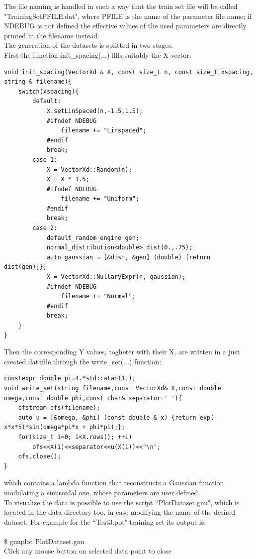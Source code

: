 \documentclass[12pt, a4paper]{report}
\theoremstyle{definition}
\begin{document}
The file naming is handled in such a way that the train set file will be called "TrainingSetPFILE.dat", where PFILE is the name of the parameter file name; if {\ttfamily NDEBUG} is not defined the effective values of the used parameters are directly printed in the filename instead.\\
The generation of the datasets is splitted in two stages.\\
First the function {\ttfamily init\_spacing(...)} fills suitably the X vector:
\begin{lstlisting}[frame=single, showstringspaces=false]
void init_spacing(VectorXd & X, const size_t n, const size_t xspacing, string & filename){
	switch(xspacing){
		default:
			X.setLinSpaced(n,-1.5,1.5);
			#ifndef NDEBUG
				filename += "Linspaced";
			#endif
			break;
		case 1:
			X = VectorXd::Random(n);
			X = X * 1.5;
			#ifndef NDEBUG
				filename += "Uniform";
			#endif
			break;
		case 2:
			default_random_engine gen;
			normal_distribution<double> dist(0.,.75);
			auto gaussian = [&dist, &gen] (double) {return dist(gen);};
			X = VectorXd::NullaryExpr(n, gaussian);
			#ifndef NDEBUG
				filename += "Normal";
			#endif
			break;
	}
}
\end{lstlisting} 
Then the corresponding Y values, togheter with their X, are written in a just created datafile through the {\ttfamily write\_set(...)} function:
\begin{lstlisting}[frame=single, showstringspaces=false]
constexpr double pi=4.*std::atan(1.);
void write_set(string filename,const VectorXd& X,const double omega,const double phi,const char& separator=' '){
	ofstream ofs(filename);
	auto u = [&omega, &phi] (const double & x) {return exp(-x*x*5)*sin(omega*pi*x + phi*pi);};	
	for(size_t i=0; i<X.rows(); ++i)
		ofs<<X(i)<<separator<<u(X(i))<<"\n";
	ofs.close();
}
\end{lstlisting}
which contains a lambda function that reconstructs a Gaussian function modulating a sinusoidal one, whose parameters are user defined.\\
To visualize the data is possible to use the \cite{gnuplot} script ``PlotDataset.gnu", which is located in the data directory too, in case modifying the name of the desired dataset. For example for the ``Test3.pot" training set its output is:\\
{\\ \ttfamily \$ gnuplot PlotDataset.gnu\\
Click any mouse button on selected data point to close}
\end{document}
